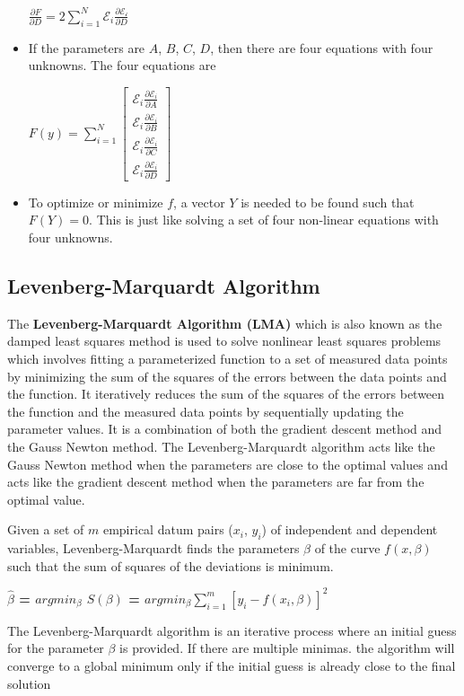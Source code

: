 \documentclass[a4paper]{aitthesis}
\begin{document}
\begin{itemize}
\begin{center}
\large \textbf{$\frac{\partial F}{\partial D}= 2 \sum_{i = 1}^{N}\mathscr{E}_i \frac{\partial \mathscr{E_i}}{\partial D}$}
\end{center}
\item If the parameters are $A$, $B$, $C$, $D$, then there are four equations with four unknowns. The four equations are 
\begin{center}
\large
$F(y) = \sum_{i = 1}^{N} \begin{bmatrix} \mathscr{E}_i \frac{\partial \mathscr{E}_i}{\partial A} \\ \mathscr{E}_i \frac{\partial \mathscr{E}_i}{\partial B}\\ \mathscr{E}_i \frac{\partial \mathscr{E}_i}{\partial C} \\ \mathscr{E}_i \frac{\partial \mathscr{E}_i}{\partial D} 
\end{bmatrix}$
\end{center}
\item To optimize or minimize $f$, a vector $Y$ is needed to be found such that $F(Y) = 0$. This is just like solving a set of four non-linear equations with four unknowns.
\end{itemize}

\subsection{Levenberg-Marquardt Algorithm}
The \textbf{Levenberg-Marquardt Algorithm (LMA)} which is also known as the damped least squares method is used to solve nonlinear least squares problems which involves fitting a parameterized function to a set of measured data points by minimizing the sum of the squares of the errors between the data points  and the function. It iteratively reduces the sum of the squares of the errors between the function and the measured data points by sequentially updating the parameter values. It is a combination of both the gradient descent method and the Gauss Newton method. The Levenberg-Marquardt algorithm acts like the Gauss Newton method when the parameters are close to the optimal values and acts like the gradient descent method when the parameters are far from the optimal value.

Given a set of $m$ empirical datum pairs ($x_i$, $y_i$) of independent and dependent variables, Levenberg-Marquardt finds the parameters $\beta$ of the curve $f(x,\beta)$ such that the sum of squares of the deviations is minimum. \newline
\begin{center}
\large \textbf{$\hat{\beta}$ = $argmin_\beta$ $S(\beta)$ = $argmin_\beta\sum_{i=1}^{m} [y_i - f(x_i,\beta)]^2$}
\end{center}
The Levenberg-Marquardt algorithm is an iterative process where an initial guess for the parameter $\beta$ is provided. If there are multiple minimas. the algorithm will converge to a global minimum only if the initial guess is already close to the final solution
\end{document}
